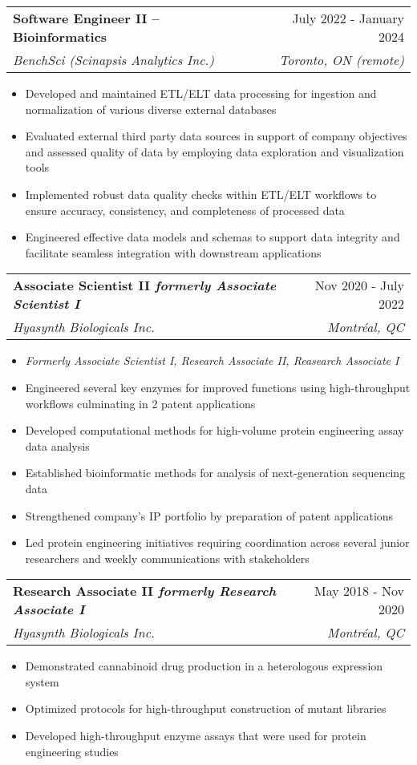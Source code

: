 \documentclass[letterpaper,12pt]{article}
\makeatletter
\newcommand{\resumeItem}[1]{
  \item\small{
    {#1 \vspace{-2pt}}
  }
}
\newcommand{\resumeSubheading}[4]{
  \vspace{-2pt}\item
    \begin{tabular*}{0.97\textwidth}[t]{l@{\extracolsep{\fill}}r}
      \textbf{#1} & #2 \\
      \textit{\small#3} & \textit{\small #4} \\
    \end{tabular*}\vspace{-7pt}
}
\newcommand{\resumeSubSubheading}[2]{
    \item
    \begin{tabular*}{0.97\textwidth}{l@{\extracolsep{\fill}}r}
      \textit{\small#1} & \textit{\small #2} \\
    \end{tabular*}\vspace{-7pt}
}
\newcommand{\resumeSubHeadingListEnd}{\end{itemize}}
\newcommand{\resumeItemListStart}{\begin{itemize}}
\newcommand{\resumeItemListEnd}{\end{itemize}\vspace{-5pt}}
\makeatother
\begin{document}
    \resumeSubheading
      {Software Engineer II -- Bioinformatics}{July 2022 - January 2024}
      {BenchSci (Scinapsis Analytics Inc.)}{Toronto, ON \emph(remote)}
      \resumeItemListStart
        \resumeItem{Developed and maintained ETL/ELT data processing for ingestion and normalization of various diverse external databases}
        \resumeItem{Evaluated external third party data sources in support of company objectives and assessed quality of data by employing data exploration and visualization tools}
	  \resumeItem{Implemented robust data quality checks within ETL/ELT workflows to ensure accuracy, consistency, and completeness of processed data}
        \resumeItem{Engineered effective data models and schemas to support data integrity and facilitate seamless integration with downstream applications}
    \resumeItemListEnd 

      

    \resumeSubheading
      {Associate Scientist II \small{\textit{formerly Associate Scientist I}}}{Nov 2020 - July 2022}
      {Hyasynth Biologicals Inc.}{Montréal, QC}
      \resumeItemListStart
       \resumeItem{\emph{Formerly Associate Scientist I, Research Associate II, Reasearch Associate I}}
		\resumeItem{Engineered several key enzymes for improved functions using high-throughput workflows culminating in 2 patent applications}        	
		\resumeItem{Developed computational methods for high-volume protein engineering assay data analysis}
		\resumeItem{Established bioinformatic methods for analysis of next-generation sequencing data}
        	\resumeItem{Strengthened company's IP portfolio by preparation of patent applications}
        	\resumeItem{Led protein engineering initiatives requiring coordination across several junior researchers and weekly communications with stakeholders}
    \resumeItemListEnd

    \resumeSubheading
      {Research Associate II \small{\textit{formerly Research Associate I}}}{May 2018 - Nov 2020}
      {Hyasynth Biologicals Inc.}{Montréal, QC}
      \resumeItemListStart
        \resumeItem{Demonstrated cannabinoid drug production in a heterologous expression system}
        \resumeItem{Optimized protocols for high-throughput construction of mutant libraries}
        \resumeItem{Developed high-throughput enzyme assays that were used for protein engineering studies}
    \resumeItemListEnd
\end{document}
